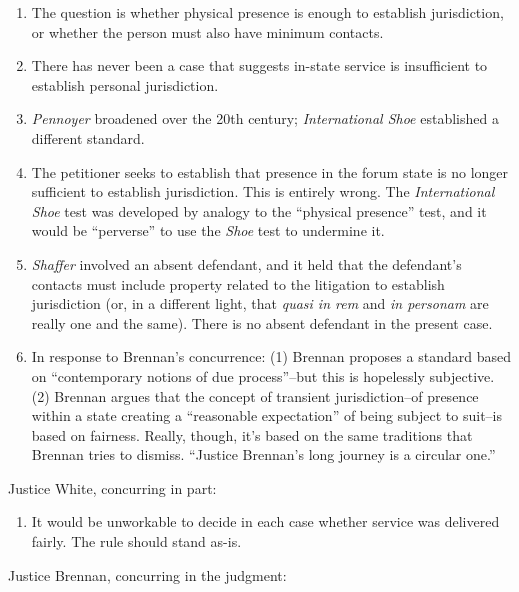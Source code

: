 \begin{enumerate}
\item
  The question is whether physical presence is enough to establish
  jurisdiction, or whether the person must also have minimum contacts.
\item
  There has never been a case that suggests in-state service is
  insufficient to establish personal jurisdiction.
\item
  \emph{Pennoyer} broadened over the 20th century; \emph{International
  Shoe} established a different standard.
\item
  The petitioner seeks to establish that presence in the forum state is
  no longer sufficient to establish jurisdiction. This is entirely
  wrong. The \emph{International Shoe} test was developed by analogy to
  the ``physical presence'' test, and it would be ``perverse'' to use
  the \emph{Shoe} test to undermine it.
\item
  \emph{Shaffer} involved an absent defendant, and it held that the
  defendant's contacts must include property related to the litigation
  to establish jurisdiction (or, in a different light, that \emph{quasi
  in rem} and \emph{in personam} are really one and the same). There is
  no absent defendant in the present case.
\item
  In response to Brennan's concurrence: (1) Brennan proposes a standard
  based on ``contemporary notions of due process''--but this is
  hopelessly subjective. (2) Brennan argues that the concept of
  transient jurisdiction--of presence within a state creating a
  ``reasonable expectation'' of being subject to suit--is based on
  fairness. Really, though, it's based on the same traditions that
  Brennan tries to dismiss. ``Justice Brennan's long journey is a
  circular one.''
\end{enumerate}

Justice White, concurring in part:

\begin{enumerate}
\item
  It would be unworkable to decide in each case whether service was
  delivered fairly. The rule should stand as-is.
\end{enumerate}

Justice Brennan, concurring in the judgment:

